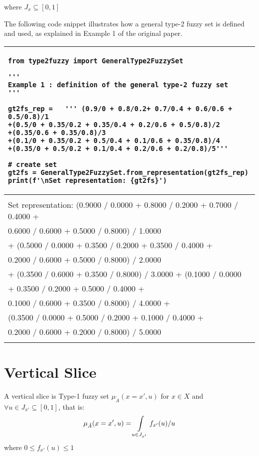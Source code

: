 \documentclass[]{article}
\begin{document}
where $J_{x}\subseteq[0,1]$

\bigskip

The following code snippet illustrates how a general type-2 fuzzy set is defined and used, as explained in Example 1 of the original paper. 

\bigskip

\begin{tabular}{|l|}
\hline 
\lstset{language=Python}
\lstset{basicstyle=\scriptsize}
\begin{lstlisting}
from type2fuzzy import GeneralType2FuzzySet

'''
Example 1 : definition of the general type-2 fuzzy set
'''

gt2fs_rep =   ''' (0.9/0 + 0.8/0.2+ 0.7/0.4 + 0.6/0.6 + 0.5/0.8)/1
+(0.5/0 + 0.35/0.2 + 0.35/0.4 + 0.2/0.6 + 0.5/0.8)/2
+(0.35/0.6 + 0.35/0.8)/3
+(0.1/0 + 0.35/0.2 + 0.5/0.4 + 0.1/0.6 + 0.35/0.8)/4
+(0.35/0 + 0.5/0.2 + 0.1/0.4 + 0.2/0.6 + 0.2/0.8)/5'''

# create set
gt2fs = GeneralType2FuzzySet.from_representation(gt2fs_rep)
print(f'\nSet representation: {gt2fs}')
\end{lstlisting}
\\
\hline
\\
Set representation:
{\small (0.9000 / 0.0000 + 0.8000 / 0.2000 + 0.7000 / 0.4000 + }\\
{\small 0.6000 / 0.6000 + 0.5000 / 0.8000) / 1.0000}\\
{\small + (0.5000 / 0.0000 + 0.3500 / 0.2000 + 0.3500 / 0.4000 + }\\
{\small 0.2000 / 0.6000 + 0.5000 / 0.8000) / 2.0000 }\\
{\small + (0.3500 / 0.6000 + 0.3500 / 0.8000) / 3.0000 + (0.1000 / 0.0000}\\
{\small + 0.3500 / 0.2000 + 0.5000 / 0.4000 +}\\
{\small 0.1000 / 0.6000 + 0.3500 / 0.8000) / 4.0000 +} \\
{\small (0.3500 / 0.0000 + 0.5000 / 0.2000 + 0.1000 / 0.4000 +} \\
{\small 0.2000 / 0.6000 + 0.2000 / 0.8000) / 5.0000}\\
\\ 
\hline 
\end{tabular} 


\section{Vertical Slice}

 A vertical slice is Type-1 fuzzy set $\mu_{\tilde{A}}(x=x',u)$ for $x\in X$ and $\forall u \in J_{x'}\subseteq[0,1]$, that is:
\begin{equation}
\mu_{\tilde{A}}(x=x',u)=\int\displaylimits_{u\in J_{x'}}f_{x'}(u)\slash u
\end{equation} 
where $0\leq f_{x'}(u)\leq 1$
\end{document}
